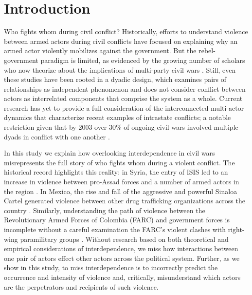 \section*{Introduction}

Who fights whom during civil conflict? Historically, efforts to understand violence between armed actors during civil conflicts have focused on explaining why an armed actor violently mobilizes against the government. But the rebel-government paradigm is limited, as evidenced by the growing number of scholars who now theorize about the implications of multi-party civil wars \citep{cunningham:2006,akcinaroglu:2012}. Still, even these studies have been rooted in a dyadic design, which examines pairs of relationships as independent phenomenon and does not consider conflict between actors as interrelated components that comprise the system as a whole.  Current research has yet to provide a full consideration of the interconnected multi-actor dynamics that characterize recent examples of intrastate conflicts;  a notable restriction given that by 2003 over 30\% of ongoing civil wars involved multiple dyads in conflict with one another \citep{harbom:etal:2008}. 

In this study we explain how overlooking interdependence in civil wars misrepresents the full story of who fights whom during a violent conflict. The historical record highlights this reality: in Syria, the entry of ISIS led to an increase in violence between pro-Assad forces and a number of armed actors in the region \citep{beauchamp:2014; schmitt:2018}. In Mexico, the rise and fall of the aggressive and powerful Sinaloa Cartel generated violence between other drug trafficking organizations across the country \citep{rosa:shirk:2018}. Similarly, understanding the path of violence between the Revolutionary Armed Forces of Colombia (FARC) and government forces is incomplete without a careful examination the FARC's violent clashes with right-wing paramilitary groups \citep{alesma:2015}. Without research based on both theoretical and empirical considerations of interdependence, we miss how interactions between one pair of actors effect other actors across the political system. Further, as we show in this study, to miss interdependence is to  incorrectly predict the occurrence and intensity of violence and, critically, misunderstand which actors are the perpetrators and recipients of such violence. 

